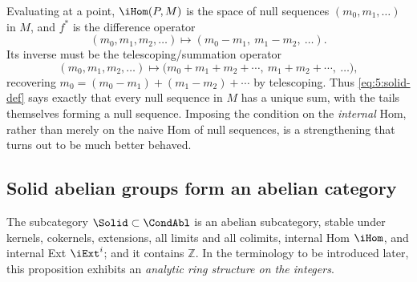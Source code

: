 \begin{remark}
\label{rmk:5:summation-interpretation}
Evaluating at a point, $\iHom(P,M)$ is the space of null sequences
$(m_0,m_1,\dots)$ in $M$, and $f^\ast$ is the difference operator
\begin{equation*}
(m_0,m_1,m_2,\dots)\longmapsto(m_0-m_1,\ m_1-m_2,\ \dots).
\end{equation*}
Its inverse must be the telescoping/summation operator
\begin{equation*}
(m_0,m_1,m_2,\dots)\longmapsto
\bigl(m_0+m_1+m_2+\cdots,\ m_1+m_2+\cdots,\ \dots\bigr),
\end{equation*}
recovering $m_0=(m_0-m_1)+(m_1-m_2)+\cdots$ by telescoping. Thus \eqref{eq:5:solid-def}
says exactly that every null sequence in $M$ has a unique sum, with the tails
themselves forming a null sequence. Imposing the condition on the \emph{internal}
Hom, rather than merely on the naive Hom of null sequences, is a strengthening
that turns out to be much better behaved.
\end{remark}

\subsection{Solid abelian groups form an abelian category}

\begin{proposition}
\label{prop:5:solid-abelian}
The subcategory $\Solid\subset\CondAbl$ is an abelian subcategory, stable under
kernels, cokernels, extensions, all limits and all colimits, internal Hom
$\iHom$, and internal Ext $\iExt^{i}$; and it contains $\mathbb{Z}$. In the
terminology to be introduced later, this proposition exhibits an \emph{analytic
ring structure on the integers}.
\end{proposition}


